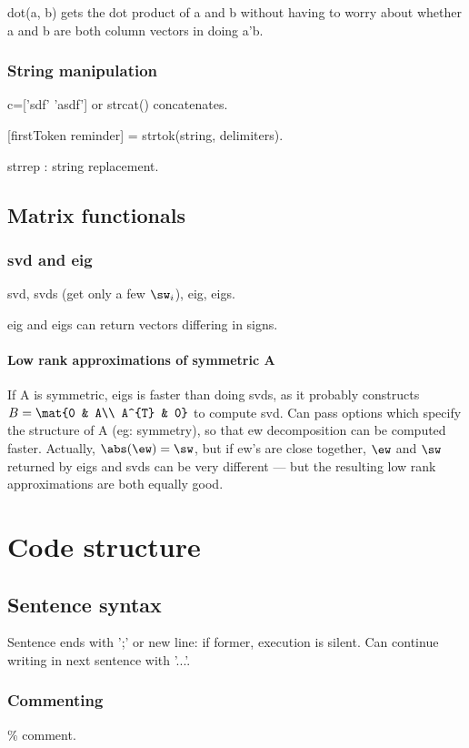 \documentclass[oneside, article]{memoir}
\begin{document}
dot(a, b) gets the dot product of a and b without having to worry about whether a and b are both column vectors in doing a'b.

\subsubsection{String manipulation}
c=['sdf' 'asdf'] or strcat() concatenates.

[firstToken reminder] = strtok(string, delimiters).

strrep : string replacement.

\subsection{Matrix functionals}
\subsubsection{svd and eig}
svd, svds (get only a few $\sw_i$), eig, eigs.

eig and eigs can return vectors differing in signs. \why

\paragraph*{Low rank approximations of symmetric A}
If A is symmetric, eigs is faster than doing svds, as it probably constructs $B = \mat{0 & A\\ A^{T} & 0}$ to compute svd. Can pass options which specify the structure of A (eg: symmetry), so that ew decomposition can be computed faster. Actually, $\abs(\ew) = \sw$, but if ew's are close together, $\ew$ and $\sw$ returned by eigs and svds can be very different --- but the resulting low rank approximations are both equally good.

\section{Code structure}
\subsection{Sentence syntax}
Sentence ends with ';' or new line: if former, execution is silent. Can continue writing in next sentence with '...'.

\subsubsection{Commenting}
\% comment.
\end{document}
